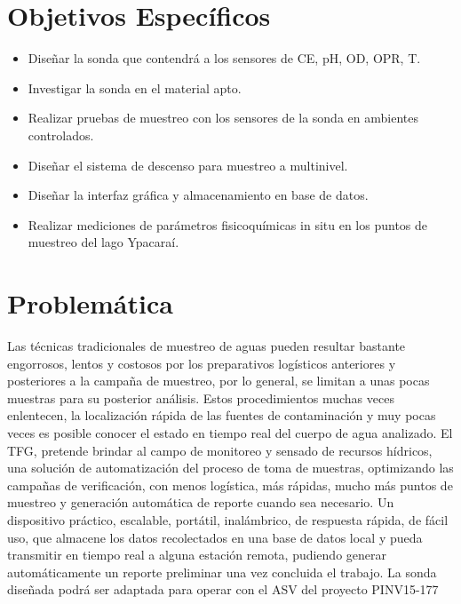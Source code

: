 \section{Objetivos Específicos} \label{Objetivos}
\begin{itemize}
	\item Dise\~nar la sonda que contendrá a los sensores de CE, pH, OD, OPR, T.
    \item Investigar la sonda en el material apto.
    \item Realizar pruebas de muestreo con los sensores de la sonda en ambientes controlados.
    \item Dise\~nar el sistema de descenso para muestreo a multinivel.
    \item Dise\~nar la interfaz gráfica y almacenamiento en base de datos.  
    \item Realizar mediciones de par\'ametros fisicoqu\'imicas in situ en los puntos de muestreo del lago Ypacaraí.
\end{itemize}

\section{Problemática} 
Las técnicas tradicionales de muestreo  de aguas pueden resultar bastante engorrosos, lentos y costosos por los preparativos logísticos anteriores y posteriores a la campaña de muestreo, por lo general, se limitan a unas pocas muestras para su posterior análisis. 
Estos procedimientos muchas veces enlentecen, la localizaci\'on rápida de las fuentes de contaminación y muy pocas veces es posible conocer el estado en tiempo real del cuerpo de agua analizado. 
El TFG, pretende brindar al campo de monitoreo y sensado de recursos h\'idricos, una soluci\'on de automatizaci\'on del proceso de toma de muestras, optimizando  las campañas de verificaci\'on, con menos log\'istica, m\'as r\'apidas,  mucho m\'as puntos de muestreo y generaci\'on autom\'atica de reporte cuando sea necesario. 
Un dispositivo pr\'actico, escalable, portátil, inalámbrico, de respuesta rápida, de fácil uso, que almacene los datos recolectados en una base de datos local y pueda transmitir en tiempo real a alguna estación remota, pudiendo generar automáticamente un reporte preliminar una vez concluida el trabajo. 
La sonda diseñada podr\'a ser adaptada para operar con el ASV del proyecto PINV15-177

